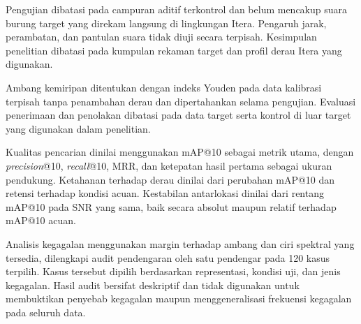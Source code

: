 \begin{daftarBernomor}
    \item Pengujian dibatasi pada campuran aditif terkontrol dan belum
    mencakup suara burung target yang direkam langsung di lingkungan
    Itera. Pengaruh jarak, perambatan, dan pantulan suara tidak diuji
    secara terpisah. Kesimpulan penelitian dibatasi pada kumpulan
    rekaman target dan profil derau Itera yang digunakan.

    \item Ambang kemiripan ditentukan dengan indeks Youden pada data kalibrasi
    terpisah tanpa penambahan derau dan dipertahankan selama pengujian.
    Evaluasi penerimaan dan penolakan dibatasi pada data target serta
    kontrol di luar target yang digunakan dalam penelitian.

    \item Kualitas pencarian dinilai menggunakan mAP@10 sebagai metrik
    utama, dengan \textit{precision}@10, \textit{recall}@10, MRR, dan
    ketepatan hasil pertama sebagai ukuran pendukung. Ketahanan terhadap
    derau dinilai dari perubahan mAP@10 dan retensi terhadap kondisi
    acuan. Kestabilan antarlokasi dinilai dari rentang mAP@10 pada SNR
    yang sama, baik secara absolut maupun relatif terhadap mAP@10 acuan.

    \item Analisis kegagalan menggunakan margin terhadap ambang dan ciri
    spektral yang tersedia, dilengkapi audit pendengaran oleh satu
    pendengar pada 120 kasus terpilih. Kasus tersebut dipilih
    berdasarkan representasi, kondisi uji, dan jenis kegagalan. Hasil
    audit bersifat deskriptif dan tidak digunakan untuk membuktikan
    penyebab kegagalan maupun menggeneralisasi frekuensi kegagalan pada
    seluruh data.
\end{daftarBernomor}
